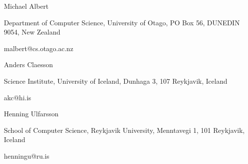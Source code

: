 


\begin{cventries}


\cventry
{Michael Albert}
{}
{}
{}
{
\begin{cvitems} %
  \item {Department of Computer Science, University of Otago, PO Box 56, DUNEDIN 9054, New Zealand}
  \item {malbert@cs.otago.ac.nz}
\end{cvitems}
}


\cventry
{Anders Claesson}
{}
{}
{}
{
\begin{cvitems} %
  \item {Science Institute, University of Iceland, Dunhaga 3, 107 Reykjavik, Iceland}
  \item {akc@hi.is}
\end{cvitems}
}


\cventry
{Henning Ulfarsson}
{}
{}
{}
{
\begin{cvitems} %
  \item {School of Computer Science, Reykjavik University, Menntavegi 1, 101 Reykjavik, Iceland}
  \item {henningu@ru.is}
\end{cvitems}
}



\end{cventries}
